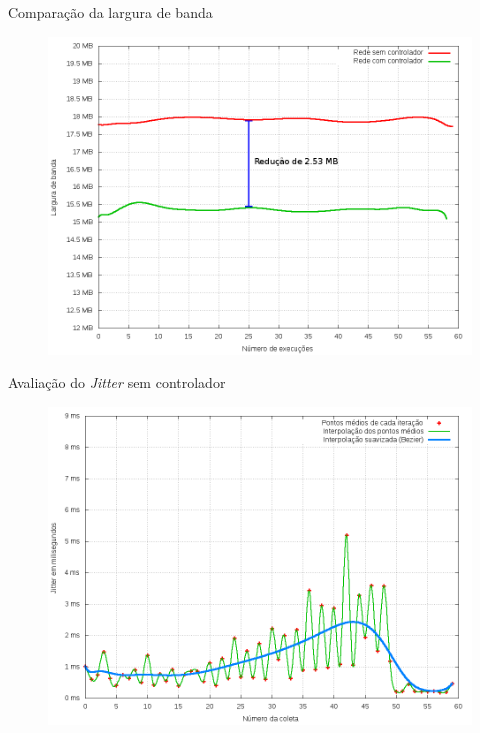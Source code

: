 \begin{frame}{Comparação da largura de banda}

    \begin{figure}[!htb]
        \centering
        \includegraphics[scale=.35]{images/bandwidth-diff}
    \end{figure}
\end{frame}


\begin{frame}{Avaliação do \emph{Jitter} sem controlador}

    \begin{figure}[!htb]
        \centering
        \includegraphics[scale=.35]{images/jitter-no-ctrl}
    \end{figure}
\end{frame}



